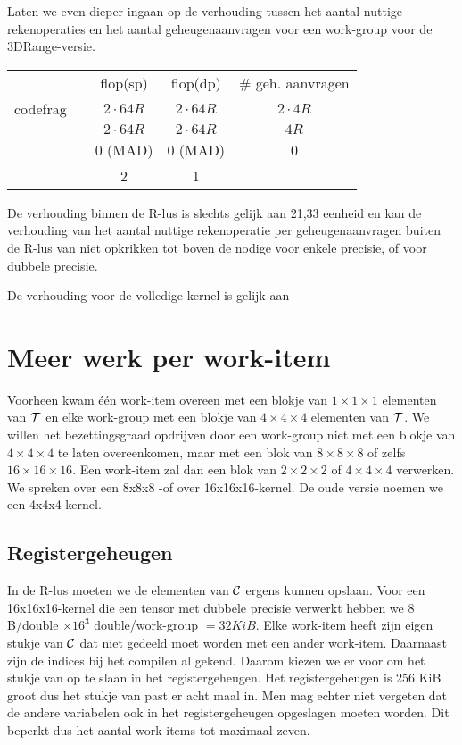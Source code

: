 
Laten we even dieper ingaan op de verhouding tussen het aantal nuttige rekenoperaties en het aantal geheugenaanvragen voor een work-group voor de 3DRange-versie.
\begin{tabular}{|r l|c| c|c|}
\hline
					&							& flop(sp)			& flop(dp) 			& \# geh. aanvragen	\\
codefrag			&							& $2 \cdot 64 R$	& $2 \cdot 64 R$	&	$2\cdot4R$		\\
					&							& $2 \cdot 64 R$	& $2 \cdot 64 R$	& 	$4R$			\\
					&							& 0 (MAD)			& 0 (MAD)			& 	0				\\
\hline
					&							& 2					& 1					&					\\
\end{tabular}
De verhouding binnen de R-lus is slechts gelijk aan 21,33 \todo eenheid en kan de verhouding van het aantal nuttige rekenoperatie per geheugenaanvragen buiten de R-lus van  niet opkrikken tot boven de nodige  voor enkele precisie, of  voor dubbele precisie.

De verhouding voor de volledige kernel is gelijk aan

\section{Meer werk per work-item}
Voorheen kwam \'e\'en work-item overeen met een blokje van $1 \times 1 \times 1$ elementen van $\mathcal{T}$ en elke work-group met een blokje van $4 \times 4 \times 4$ elementen van $\mathcal{T}$. We willen het bezettingsgraad opdrijven  door een work-group niet met een blokje van $4 \times 4 \times 4$ te laten overeenkomen, maar met een blok van $8 \times 8 \times 8$ of zelfs $16 \times 16 \times 16$. Een work-item zal dan een blok van $2 \times 2 \times 2$ of $4 \times 4 \times 4$ verwerken. We spreken over een 8x8x8 -of over 16x16x16-kernel. De oude versie noemen we een 4x4x4-kernel.

\subsection{Registergeheugen}
In de R-lus moeten we de elementen van $\mathcal{C}$ ergens kunnen opslaan. Voor een 16x16x16-kernel die een tensor met dubbele precisie verwerkt hebben we $8$ B/double $\times 16^3$ double/work-group $= 32KiB$. Elke work-item heeft zijn eigen stukje van $\mathcal{C}$ dat niet gedeeld moet worden met een ander work-item. Daarnaast zijn de indices bij het compilen al gekend. Daarom kiezen we er voor om het stukje van \CC op te slaan in het registergeheugen. Het registergeheugen is 256 KiB groot dus het stukje van \CC past er acht maal in.  Men mag echter niet vergeten dat de andere variabelen ook in het registergeheugen opgeslagen moeten worden.  Dit beperkt dus het aantal work-items tot maximaal zeven. 

